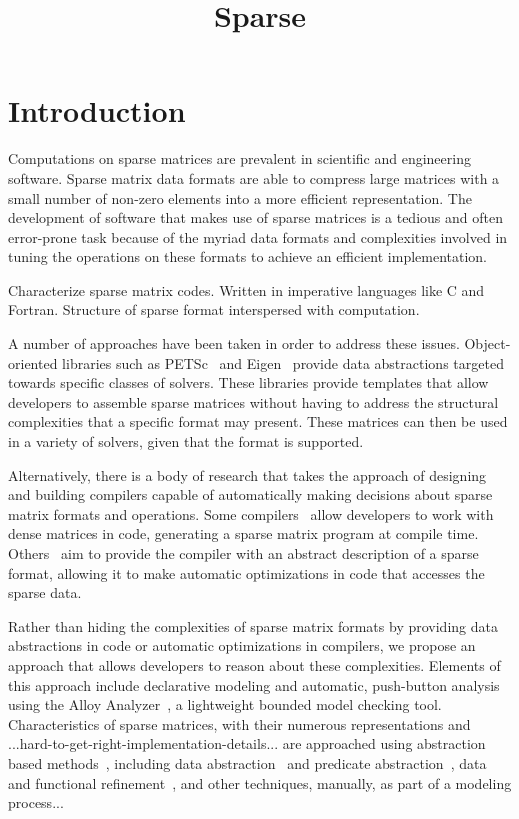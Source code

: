 \documentclass[11pt,conference]{IEEEtran}
\begin{document}
\title{Sparse}
\author{
  \and
}

\maketitle

\section{Introduction}

Computations on sparse matrices are prevalent in scientific and engineering software.  Sparse matrix data formats are able to compress large matrices with a small number of non-zero elements into a more efficient representation.  The development of software that makes use of sparse matrices is a tedious and often error-prone task because of the myriad data formats and complexities involved in tuning the operations on these formats to achieve an efficient implementation.

Characterize sparse matrix codes. Written in imperative languages like C and Fortran.  Structure of sparse format interspersed with computation.  

A number of approaches have been taken in order to address these issues.  Object-oriented libraries such as PETSc~\cite{petsc2019} and Eigen~\cite{eigenweb2010} provide data abstractions targeted towards specific classes of solvers.  These libraries provide templates that allow developers to assemble sparse matrices without having to address the structural complexities that a specific format may present.  These matrices can then be used in a variety of solvers, given that the format is supported.

Alternatively, there is a body of research that takes the approach of designing and building compilers capable of automatically making decisions about sparse matrix formats and operations.  Some compilers~\cite{bik1995, bik1996} allow developers to work with dense matrices in code, generating a sparse matrix program at compile time.  Others~\cite{kotlyar1997} aim to provide the compiler with an abstract description of a sparse format, allowing it to make automatic optimizations in code that accesses the sparse data.

Rather than hiding the complexities of sparse matrix formats by providing data abstractions in code or automatic optimizations in compilers, we propose an approach that allows developers to reason about these complexities.  Elements of this approach include declarative modeling and automatic, push-button analysis using the Alloy Analyzer~\cite{jackson2012}, a lightweight bounded model checking tool.  Characteristics of sparse matrices, with their numerous representations and ...hard-to-get-right-implementation-details... are approached using abstraction based methods~\cite{clarke1994}, including data abstraction~\cite{dingel1995} and predicate abstraction~\cite{graf1997}, data and functional refinement~\cite{woodcock1996}, and other techniques, manually, as part of a modeling process...
\end{document}
